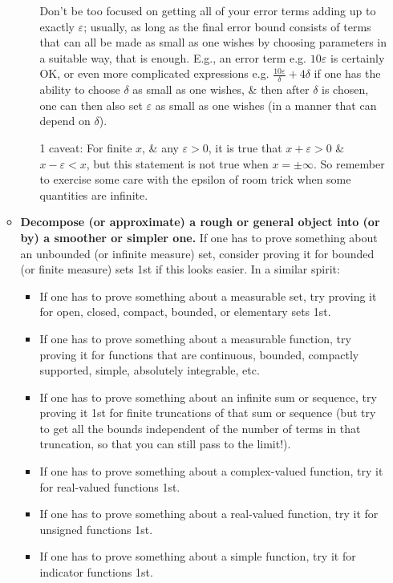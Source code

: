\documentclass{article}
\begin{document}
\begin{enumerate}
\begin{itemize}
\begin{itemize}
\begin{itemize}
			\end{itemize}
			Don't be too focused on getting all of your error terms adding up to exactly $\varepsilon$; usually, as long as the final error bound consists of terms that can all be made as small as one wishes by choosing parameters in a suitable way, that is enough. E.g., an error term e.g. $10\varepsilon$ is certainly OK, or even more complicated expressions e.g. $\frac{10\varepsilon}{\delta} + 4\delta$ if one has the ability to choose $\delta$ as small as one wishes, \& then after $\delta$ is chosen, one can then also set $\varepsilon$ as small as one wishes (in a manner that can depend on $\delta$).
			
			1 caveat: For finite $x$, \& any $\varepsilon > 0$, it is true that $x + \varepsilon > 0$ \& $x - \varepsilon < x$, but this statement is not true when $x = \pm\infty$. So remember to exercise some care with the epsilon of room trick when some quantities are infinite.
		\end{itemize}
		\item {\bf Decompose (or approximate) a rough or general object into (or by) a smoother or simpler one.} If one has to prove something about an unbounded (or infinite measure) set, consider proving it for bounded (or finite measure) sets 1st if this looks easier. In a similar spirit:
		\begin{itemize}
			\item If one has to prove something about a measurable set, try proving it for open, closed, compact, bounded, or elementary sets 1st.
			\item If one has to prove something about a measurable function, try proving it for functions that are continuous, bounded, compactly supported, simple, absolutely integrable, etc.
			\item If one has to prove something about an infinite sum or sequence, try proving it 1st for finite truncations of that sum or sequence (but try to get all the bounds independent of the number of terms in that truncation, so that you can still pass to the limit!).
			\item If one has to prove something about a complex-valued function, try it for real-valued functions 1st.
			\item If one has to prove something about a real-valued function, try it for unsigned functions 1st.
			\item If one has to prove something about a simple function, try it for indicator functions 1st.
		\end{itemize}

\end{itemize}
\end{enumerate}
\end{document}
